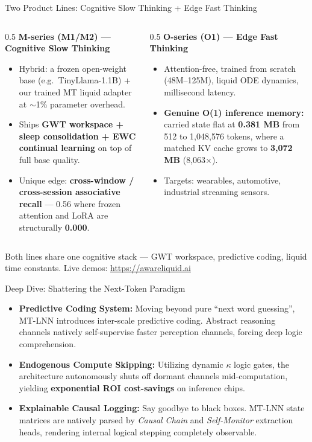 ﻿\documentclass[aspectratio=169, 10pt]{beamer}
\begin{document}
\begin{frame}{Two Product Lines: Cognitive Slow Thinking + Edge Fast Thinking}
\small
\begin{columns}[T]
\begin{column}{0.5\textwidth}
\textbf{M-series (M1/M2) --- Cognitive Slow Thinking}
\begin{itemize}\itemsep=0.3em
    \item Hybrid: a frozen open-weight base (e.g.\ TinyLlama-1.1B) + our trained MT liquid adapter at $\sim$1\% parameter overhead.
    \item Ships \textbf{GWT workspace + sleep consolidation + EWC continual learning} on top of full base quality.
    \item Unique edge: \textbf{cross-window / cross-session associative recall} --- 0.56 where frozen attention and LoRA are structurally \textbf{0.000}.
\end{itemize}
\end{column}
\begin{column}{0.5\textwidth}
\textbf{O-series (O1) --- Edge Fast Thinking}
\begin{itemize}\itemsep=0.3em
    \item Attention-free, trained from scratch (48M--125M), liquid ODE dynamics, millisecond latency.
    \item \textbf{Genuine O(1) inference memory:} carried state flat at \textbf{0.381 MB} from 512 to 1{,}048{,}576 tokens, where a matched KV cache grows to \textbf{3{,}072 MB} (8{,}063$\times$).
    \item Targets: wearables, automotive, industrial streaming sensors.
\end{itemize}
\end{column}
\end{columns}
\vspace{0.4em}
{\footnotesize Both lines share one cognitive stack --- GWT workspace, predictive coding, liquid time constants. Live demos: \url{https://awareliquid.ai}}
\end{frame}

\begin{frame}{Deep Dive: Shattering the Next-Token Paradigm}
\begin{itemize}
    \item \textbf{Predictive Coding System:} Moving beyond pure ``next word guessing'', MT-LNN introduces inter-scale predictive coding. Abstract reasoning channels natively self-supervise faster perception channels, forcing deep logic comprehension.
    \item \textbf{Endogenous Compute Skipping:} Utilizing dynamic $\kappa$ logic gates, the architecture autonomously shuts off dormant channels mid-computation, yielding \textbf{exponential ROI cost-savings} on inference chips.
    \item \textbf{Explainable Causal Logging:} Say goodbye to black boxes. MT-LNN state matrices are natively parsed by \textit{Causal Chain} and \textit{Self-Monitor} extraction heads, rendering internal logical stepping completely observable.
\end{itemize}
\end{frame}
\end{document}
